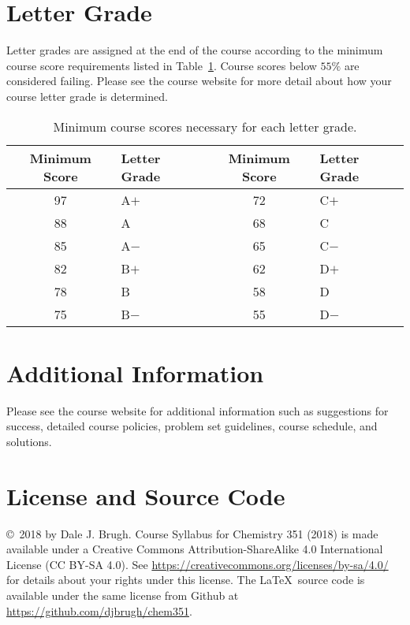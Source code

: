\documentclass[letterpaper,oneside,onecolumn,11pt,article]{memoir}
\begin{document}
\section{Letter Grade}
Letter grades are assigned at the end of the course according to the minimum course score requirements listed in Table~\ref{tab:lettergrades}. Course scores below $55\%$ are considered failing. Please see the course website for more detail about how your course letter grade is determined. 
\begin{table}[h]
\caption{\sffamily Minimum course scores necessary for each letter grade.}
\label{tab:lettergrades}
\begin{tabular}{cl||cl} \toprule
\textbf{Minimum Score} & \textbf{Letter Grade} & \textbf{Minimum Score} & \textbf{Letter Grade} \\ \hline
97 & \hspace{0.3in}A$+$ & 72 & \hspace{0.3in}C$+$ \\
88 & \hspace{0.3in}A & 68 & \hspace{0.3in}C \\
85 & \hspace{0.3in}A$-$ & 65 & \hspace{0.3in}C$-$ \\
82 & \hspace{0.3in}B$+$ & 62 & \hspace{0.3in}D$+$ \\
78 & \hspace{0.3in}B & 58 & \hspace{0.3in}D \\
75 & \hspace{0.3in}B$-$ & 55 & \hspace{0.3in}D$-$ \\
\bottomrule
\end{tabular}
\end{table}
%
%
\section{Additional Information}
Please see the course website for additional information such as suggestions for success, detailed course policies, problem set guidelines, course schedule, and solutions. 
%
%
\section{License and Source Code}
\copyright\ 2018 by Dale J. Brugh. Course Syllabus for Chemistry 351 (2018) is made available under a Creative Commons Attribution-ShareAlike 4.0 International License (CC BY-SA 4.0). See \href{https://creativecommons.org/licenses/by-sa/4.0/}{https://creativecommons.org/licenses/by-sa/4.0/} for details about your rights under this license. The \LaTeX\ source code is available under the same license from Github at \href{https://github.com/djbrugh/chem351}{https://github.com/djbrugh/chem351}. 
\end{document}
